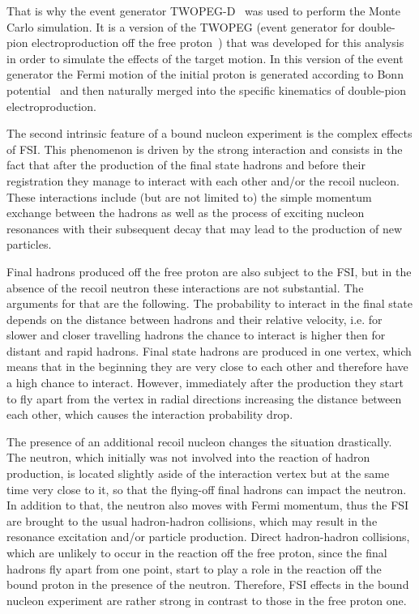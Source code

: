 That is why the event generator TWOPEG-D~\cite{twopeg-d} was used to perform the Monte Carlo simulation. It is a version of the TWOPEG (event generator for double-pion electroproduction off the free proton~\cite{twopeg}) that was developed for this analysis in order to simulate the effects of the target motion. In this version of the event generator the Fermi motion of the initial proton is generated according to Bonn potential~\cite{Machleidt:1987hj} and then naturally merged into the specific kinematics of double-pion electroproduction.

The second intrinsic feature of a bound nucleon experiment is the complex effects of FSI. This phenomenon is driven by the strong interaction and consists in the fact that after the production of the final state hadrons and before their registration they manage to interact with each other and/or the recoil nucleon. These interactions include (but are not limited to) the simple momentum exchange between the hadrons as well as the process of exciting nucleon resonances with their subsequent decay that may lead to the production of new particles. 


Final hadrons produced off the free proton are also subject to the FSI, but in the absence of the recoil neutron these interactions are not substantial. The arguments for that are the following. The probability to interact in the final state depends on the distance between hadrons and their relative velocity, i.e. for slower and closer travelling hadrons the chance to interact is higher then for distant and rapid hadrons. Final state hadrons are produced in one vertex, which means that in the beginning they are very close to each other and therefore have a high chance to interact. However, immediately after the production they start to fly apart from the vertex in radial directions increasing the distance between each other, which causes the interaction probability drop.



The presence of an additional recoil nucleon changes the situation drastically. The neutron, which initially was not involved into the reaction of hadron production, is located slightly aside of the interaction vertex but at the same time very close to it, so that the flying-off final hadrons can impact the neutron. In addition to that, the neutron also moves with Fermi momentum, thus the FSI are brought to the usual hadron-hadron collisions, which may result in the resonance excitation and/or particle production. Direct hadron-hadron collisions, which are unlikely to occur in the reaction off the free proton, since the final hadrons fly apart from one point, start to play a role in the reaction off the bound proton in the presence of the neutron. Therefore, FSI effects in the bound nucleon experiment are rather strong in contrast to those in the free proton one.

